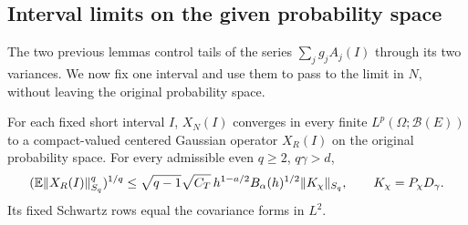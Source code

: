\subsection{Interval limits on the given probability space}

The two previous lemmas control tails of the series $\sum_jg_jA_j(I)$ through
its two variances. We now fix one interval and use them to pass to the limit in
$N$, without leaving the original probability space.

\begin{lemma}\label{L:driver-interval-limit}
  For each fixed short interval $I$, $X_N(I)$ converges in every finite
  $L^p(\Omega;\mathcal{B}(E))$ to a compact-valued centered Gaussian operator
  $X_R(I)$ on the original probability space. For every admissible even $q \ge
  2$, $q\gamma > d$,
  \begin{equation}\label{E:driver-fixed-schatten}
    (\mathbb{E}\|X_R(I)\|_{S_q}^q)^{1/q}
    \le\sqrt{q-1}\sqrt{C_T}\,h^{1-a/2}B_\alpha(h)^{1/2}
    \|K_\chi\|_{S_q},\qquad K_\chi=P_\chi D_\gamma.
  \end{equation}
  Its fixed Schwartz rows equal the covariance forms in $L^2$.
\end{lemma}

